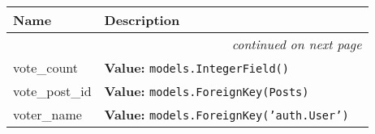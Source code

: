     \vspace{-1cm}
\hspace{\varindent}\begin{longtable}{|p{\varnamewidth}|p{\vardescrwidth}|l}
\cline{1-2}
\cline{1-2} \centering \textbf{Name} & \centering \textbf{Description}& \\
\cline{1-2}
\endhead\cline{1-2}\multicolumn{3}{r}{\small\textit{continued on next page}}\\\endfoot\cline{1-2}
\endlastfoot\raggedright v\-o\-t\-e\-\_\-c\-o\-u\-n\-t\- & \raggedright \textbf{Value:} 
{\tt models.IntegerField()}&\\
\cline{1-2}
\raggedright v\-o\-t\-e\-\_\-p\-o\-s\-t\-\_\-i\-d\- & \raggedright \textbf{Value:} 
{\tt models.ForeignKey(Posts)}&\\
\cline{1-2}
\raggedright v\-o\-t\-e\-r\-\_\-n\-a\-m\-e\- & \raggedright \textbf{Value:} 
{\tt models.ForeignKey('auth.User')}&\\
\cline{1-2}
\end{longtable}


